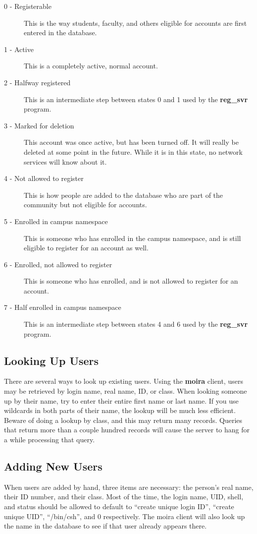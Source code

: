 \documentclass{book}
\begin{document}
\label{accountstatus}
\begin{description}
\item[0 - Registerable] This is the way students, faculty, and others
eligible for accounts are first entered in the database.
\item[1 - Active] This is a completely active, normal account.
\item[2 - Halfway registered] This is an intermediate step between states 0
and 1 used by the {\bf reg\_svr} program.
\item[3 - Marked for deletion] This account was once active, but has been
turned off.  It will really be deleted at some point in the future.
While it is in this state, no network services will know about it.
\item[4 - Not allowed to register] This is how people are added to the
database who are part of the community but not eligible for accounts.
\item[5 - Enrolled in campus namespace] This is someone who has enrolled in
the campus namespace, and is still eligible to register for an account
as well.
\item[6 - Enrolled, not allowed to register] This is someone who has
enrolled, and is not allowed to register for an account.
\item[7 - Half enrolled in campus namespace] This is an intermediate step
between states 4 and 6 used by the {\bf reg\_svr} program.
\end{description}

\subsection{Looking Up Users}

There are several ways to look up existing users.  Using the {\bf moira}
client, users may be retrieved by login name, real name, ID, or class.
When looking someone up by their name, try to enter their entire first
name or last name.  If you use wildcards in both parts of their name,
the lookup will be much less efficient.  Beware of doing a lookup by
class, and this may return many records.  Queries that return more
than a couple hundred records will cause the server to hang for a
while processing that query.

\subsection{Adding New Users}
When users are added by hand, three items are necessary: the person's
real name, their ID number, and their class.  Most of the time, the
login name, UID, shell, and status should be allowed to default to
``create unique login ID'', ``create unique UID'', ``/bin/csh'', and 0
respectively.  The moira client will also look up the name in the
database to see if that user already appears there.
\end{document}
